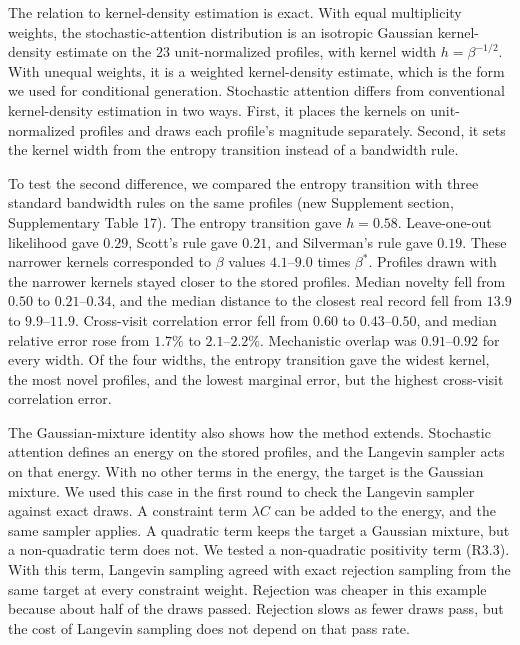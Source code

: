 \documentclass[
  11pt,
  letterpaper,
]{article}
\begin{document}
The relation to kernel-density estimation is exact. With equal
multiplicity weights, the stochastic-attention distribution is an
isotropic Gaussian kernel-density estimate on the \(23\) unit-normalized
profiles, with kernel width \(h=\beta^{-1/2}\). With unequal weights, it
is a weighted kernel-density estimate, which is the form we used for
conditional generation. Stochastic attention differs from conventional
kernel-density estimation in two ways. First, it places the kernels on
unit-normalized profiles and draws each profile's magnitude separately.
Second, it sets the kernel width from the entropy transition instead of
a bandwidth rule.

To test the second difference, we compared the entropy transition with
three standard bandwidth rules on the same profiles (new Supplement
section, Supplementary Table 17). The entropy transition gave
\(h=0.58\). Leave-one-out likelihood gave \(0.29\), Scott's rule gave
\(0.21\), and Silverman's rule gave \(0.19\). These narrower kernels
corresponded to \(\beta\) values \(4.1\)--\(9.0\) times \(\beta^*\).
Profiles drawn with the narrower kernels stayed closer to the stored
profiles. Median novelty fell from \(0.50\) to \(0.21\)--\(0.34\), and
the median distance to the closest real record fell from \(13.9\) to
\(9.9\)--\(11.9\). Cross-visit correlation error fell from \(0.60\) to
\(0.43\)--\(0.50\), and median relative error rose from \(1.7\%\) to
\(2.1\)--\(2.2\%\). Mechanistic overlap was \(0.91\)--\(0.92\) for every
width. Of the four widths, the entropy transition gave the widest
kernel, the most novel profiles, and the lowest marginal error, but the
highest cross-visit correlation error.

The Gaussian-mixture identity also shows how the method extends.
Stochastic attention defines an energy on the stored profiles, and the
Langevin sampler acts on that energy. With no other terms in the energy,
the target is the Gaussian mixture. We used this case in the first round
to check the Langevin sampler against exact draws. A constraint term
\(\lambda C\) can be added to the energy, and the same sampler applies.
A quadratic term keeps the target a Gaussian mixture, but a
non-quadratic term does not. We tested a non-quadratic positivity term
(R3.3). With this term, Langevin sampling agreed with exact rejection
sampling from the same target at every constraint weight. Rejection was
cheaper in this example because about half of the draws passed.
Rejection slows as fewer draws pass, but the cost of Langevin sampling
does not depend on that pass rate.
\end{document}
